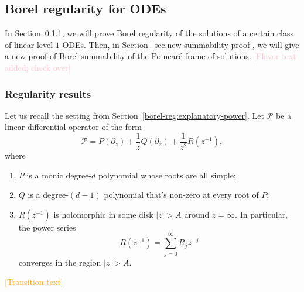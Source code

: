 \documentclass{article}
\newcommand{\C}{\mathbb{C}}
\theoremstyle{definition}
\theoremstyle{plain}
\begin{document}
\subsection{Borel regularity for ODEs}\label{borel_reg-ODE}
In Section~\ref{sec:regularity-results}, we will prove Borel regularity of the solutions of a certain class of linear level-$1$ ODEs. Then, in Section~\ref{sec:new-summability-proof}, we will give a new proof of Borel summability of the Poincar\'e frame of solutions. \textcolor{Pink}{[Flavor text added; check over]}
\subsubsection{Regularity results}\label{sec:regularity-results}
Let us recall the setting from Section~\ref{borel-reg:explanatory-power}. Let $\mathcal{P}$ be a linear differential operator of the form
\begin{equation}\label{eqn:operator-P}
    \mathcal{P} = P(\partial_z) + \frac{1}{z} Q(\partial_z) + \frac{1}{z^2} R(z^{-1}),
\end{equation}
where
\begin{enumerate}
\item $P$ is a monic degree-$d$ polynomial whose roots are all simple; 
\item $Q$ is a degree-$(d-1)$ polynomial that's non-zero at every root of $P$;
\item $R(z^{-1})$ is holomorphic in some disk $|z| > A$ around $z = \infty$. In particular, the power series
\[ R(z^{-1}) = \sum_{j=0}^\infty R_j z^{-j} \]
converges in the region $|z| > A$.
\end{enumerate}
\textcolor{orange}{[Transition text]}
\end{document}
